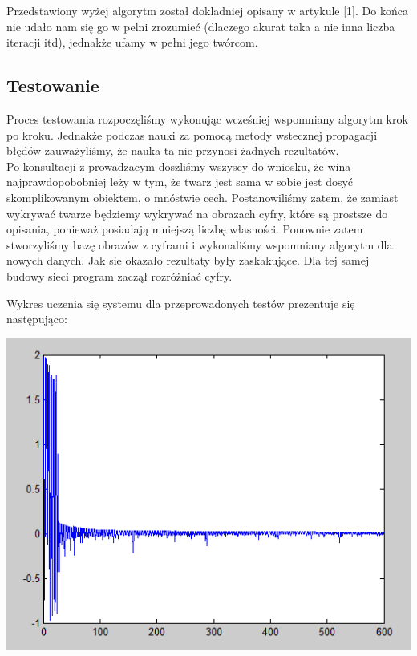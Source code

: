 \documentclass[11pt,a4paper]{article}
\begin{document}
Przedstawiony wyżej algorytm został dokladniej opisany w artykule [1]. 
Do końca nie udało nam się go w pelni zrozumieć (dlaczego akurat taka a nie inna liczba iteracji itd), 
jednakże ufamy w pełni jego twórcom.

\subsection{Testowanie}
Proces testowania rozpoczęliśmy wykonując wcześniej wspomniany algorytm krok po kroku. Jednakże podczas nauki 
za pomocą metody wstecznej propagacji błędów zauważyliśmy, że nauka ta nie przynosi żadnych rezultatów.\\
\indent
Po konsultacji z prowadzacym doszliśmy wszyscy do wniosku, że wina najprawdopobobniej leży w tym, 
że twarz jest sama w sobie jest dosyć skomplikowanym obiektem, o mnóstwie cech.
Postanowiliśmy zatem, że zamiast wykrywać twarze będziemy wykrywać na obrazach cyfry, które są prostsze do opisania,
ponieważ posiadają mniejszą liczbę własności.
Ponownie zatem stworzyliśmy bazę obrazów z cyframi i wykonaliśmy wspomniany algorytm dla nowych danych.
Jak sie okazało rezultaty były zaskakujące. Dla tej samej budowy sieci program zaczął rozróżniać cyfry.

Wykres uczenia się systemu dla przeprowadonych testów prezentuje się następująco:

\vspace*{0.5cm}
\hspace*{3cm}
\includegraphics[scale=0.6]{wykres}
\hspace*{3cm}
\vspace*{0.5cm}
\end{document}
